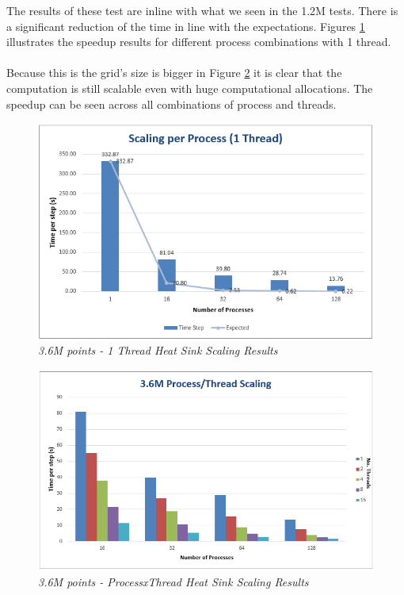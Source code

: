 \documentclass[12pt]{article}
\begin{document}
The results of these test are inline with what we seen in the 1.2M tests. There is a significant reduction of the time in line with the expectations. Figures \ref{fig:36MScaling_1} illustrates the speedup results for different process combinations with 1 thread.
\\\\
Because this is the grid's size is bigger in Figure \ref{fig:36MScaling_2} it is clear that the computation is still scalable even with huge computational allocations. The speedup can be seen across all combinations of process and threads.

\begin{figure}[h!]
    \includegraphics[scale=0.9]{scaling36M_1.png}
    \centering
    \caption{\textit{3.6M points - 1 Thread Heat Sink Scaling Results}}
    \label{fig:36MScaling_1}
\end{figure}

\begin{figure}[h!]
    \includegraphics[scale=0.8]{scaling36M_2.png}
    \centering
    \caption{\textit{3.6M points - ProcessxThread Heat Sink Scaling Results}}
    \label{fig:36MScaling_2}
\end{figure}
\end{document}
